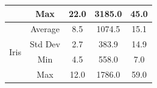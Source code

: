 \documentclass[journal]{IEEEtran}
\begin{document}
\begin{table}[]
\begin{tabular}{|c|c|c|c|c|}
		& Max                                      & 22.0                                                                                          & 3185.0                                                                                                          & 45.0                                                                                                \\ \hline
		\multirow{4}{*}{Iris}                  & Average                                  & 8.5                                                                                           & 1074.5                                                                                                          & 15.1                                                                                                \\ \cline{2-5} 
		& Std Dev                                  & 2.7                                                                                           & 383.9                                                                                                           & 14.9                                                                                                \\ \cline{2-5} 
		& Min                                      & 4.5                                                                                           & 558.0                                                                                                           & 7.0                                                                                                 \\ \cline{2-5} 
		& Max                                      & 12.0                                                                                          & 1786.0                                                                                                          & 59.0                                                                                                \\ \hline
	\end{tabular}
\end{table}
\end{document}

